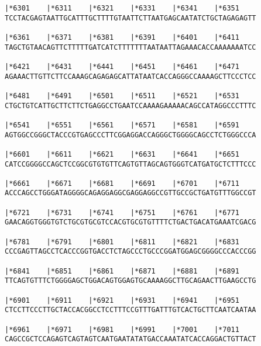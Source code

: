 \documentclass{article}
\begin{document}
\begin{Verbatim}
|*6301    |*6311    |*6321    |*6331    |*6341    |*6351    
TCCTACGAGTAATTGCATTTGCTTTTGTAATTCTTAATGAGCAATATCTGCTAGAGAGTT
                                                            
|*6361    |*6371    |*6381    |*6391    |*6401    |*6411    
TAGCTGTAACAGTTCTTTTTGATCATCTTTTTTTAATAATTAGAAACACCAAAAAAATCC
                                                            
|*6421    |*6431    |*6441    |*6451    |*6461    |*6471    
AGAAACTTGTTCTTCCAAAGCAGAGAGCATTATAATCACCAGGGCCAAAAGCTTCCCTCC
                                                            
|*6481    |*6491    |*6501    |*6511    |*6521    |*6531    
CTGCTGTCATTGCTTCTTCTGAGGCCTGAATCCAAAAGAAAAACAGCCATAGGCCCTTTC
                                                            
|*6541    |*6551    |*6561    |*6571    |*6581    |*6591    
AGTGGCCGGGCTACCCGTGAGCCCTTCGGAGGACCAGGGCTGGGGCAGCCTCTGGGCCCA
                                                            
|*6601    |*6611    |*6621    |*6631    |*6641    |*6651    
CATCCGGGGCCAGCTCCGGCGTGTGTTCAGTGTTAGCAGTGGGTCATGATGCTCTTTCCC
                                                            
|*6661    |*6671    |*6681    |*6691    |*6701    |*6711    
ACCCAGCCTGGGATAGGGGCAGAGGAGGCGAGGAGGCCGTTGCCGCTGATGTTTGGCCGT
                                                            
|*6721    |*6731    |*6741    |*6751    |*6761    |*6771    
GAACAGGTGGGTGTCTGCGTGCGTCCACGTGCGTGTTTTCTGACTGACATGAAATCGACG
                                                            
|*6781    |*6791    |*6801    |*6811    |*6821    |*6831    
CCCGAGTTAGCCTCACCCGGTGACCTCTAGCCCTGCCCGGATGGAGCGGGGCCCACCCGG
                                                            
|*6841    |*6851    |*6861    |*6871    |*6881    |*6891    
TTCAGTGTTTCTGGGGAGCTGGACAGTGGAGTGCAAAAGGCTTGCAGAACTTGAAGCCTG
                                                            
|*6901    |*6911    |*6921    |*6931    |*6941    |*6951    
CTCCTTCCCTTGCTACCACGGCCTCCTTTCCGTTTGATTTGTCACTGCTTCAATCAATAA
                                                            
|*6961    |*6971    |*6981    |*6991    |*7001    |*7011    
CAGCCGCTCCAGAGTCAGTAGTCAATGAATATATGACCAAATATCACCAGGACTGTTACT
                                                            

\end{Verbatim}
\end{document}
